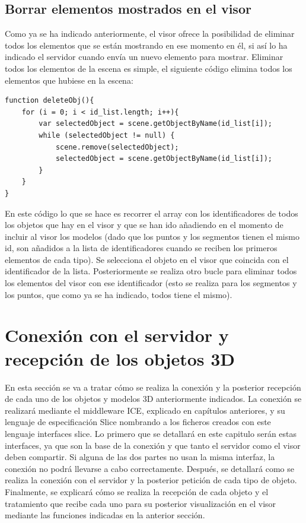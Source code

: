 \subsection{Borrar elementos mostrados en el visor}
Como ya se ha indicado anteriormente, el visor ofrece la posibilidad de eliminar todos los elementos que se están mostrando en ese momento en él, si así lo ha indicado el servidor cuando envía un nuevo elemento para mostrar. Eliminar todos los elementos de la escena es simple, el siguiente código elimina todos los elementos que hubiese en la escena:

\begin{lstlisting}[frame=single]
function deleteObj(){
	for (i = 0; i < id_list.length; i++){
		var selectedObject = scene.getObjectByName(id_list[i]);
		while (selectedObject != null) {
			scene.remove(selectedObject);
			selectedObject = scene.getObjectByName(id_list[i]);
		}
	}
}
\end{lstlisting}
En este código lo que se hace es recorrer el array con los identificadores de todos los objetos que hay en el visor y que se han ido añadiendo en el momento de incluir al visor los modelos (dado que los puntos y los segmentos tienen el mismo id, son añadidos a la lista de identificadores cuando se reciben los primeros elementos de cada tipo). Se selecciona el objeto en el visor que coincida con el identificador de la lista. Posteriormente se realiza otro bucle para eliminar todos los elementos del visor con ese identificador (esto se realiza para los segmentos y los puntos, que como ya se ha indicado, todos tiene el mismo).

\section{Conexión con el servidor y recepción de los objetos 3D}
En esta sección se va a tratar cómo se realiza la conexión y la posterior recepción de cada uno de los objetos y modelos 3D anteriormente indicados. La conexión se realizará mediante el middleware ICE, explicado en capítulos anteriores, y su lenguaje de especificación Slice nombrando a los ficheros creados con este lenguaje interfaces slice. Lo primero que se detallará en este capitulo serán estas interfaces, ya que son la base de la conexión y que tanto el servidor como el visor deben compartir. Si alguna de las dos partes no usan la misma interfaz, la conexión no podrá llevarse a cabo correctamente. Después, se detallará como se realiza la conexión con el servidor y la posterior petición de cada tipo de objeto. Finalmente, se explicará cómo se realiza la recepción de cada objeto y el tratamiento que recibe cada uno para su posterior visualización en el visor mediante las funciones indicadas en la anterior sección.

